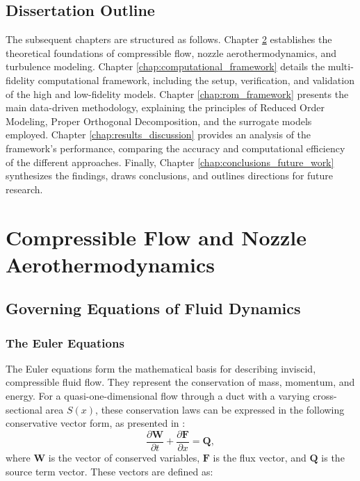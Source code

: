 \documentclass[tg, EN]{ufabcFHZh_tg}
\begin{document}
\section{Dissertation Outline}

The subsequent chapters are structured as follows. Chapter \ref{chap:governing_equations} establishes the theoretical foundations of compressible flow, nozzle aerothermodynamics, and turbulence modeling. Chapter \ref{chap:computational_framework} details the multi-fidelity computational framework, including the setup, verification, and validation of the high and low-fidelity models. Chapter \ref{chap:rom_framework} presents the main data-driven methodology, explaining the principles of Reduced Order Modeling, Proper Orthogonal Decomposition, and the surrogate models employed. Chapter \ref{chap:results_discussion} provides an analysis of the framework's performance, comparing the accuracy and computational efficiency of the different approaches. Finally, Chapter \ref{chap:conclusions_future_work} synthesizes the findings, draws conclusions, and outlines directions for future research.

\chapter{Compressible Flow and Nozzle Aerothermodynamics}
\label{chap:governing_equations}

\section{Governing Equations of Fluid Dynamics}

\subsection{The Euler Equations}

The Euler equations form the mathematical basis for describing inviscid, compressible fluid flow. They represent the conservation of mass, momentum, and energy. For a quasi-one-dimensional flow through a duct with a varying cross-sectional area $S(x)$, these conservation laws can be expressed in the following conservative vector form, as presented in \cite{anderson2003}:
\begin{equation}
    \frac{\partial \mathbf{W}}{\partial t} + \frac{\partial \mathbf{F}}{\partial x} = \mathbf{Q},
    \label{eq:euler_1d}
\end{equation}
where $\mathbf{W}$ is the vector of conserved variables, $\mathbf{F}$ is the flux vector, and $\mathbf{Q}$ is the source term vector. These vectors are defined as:
\end{document}
